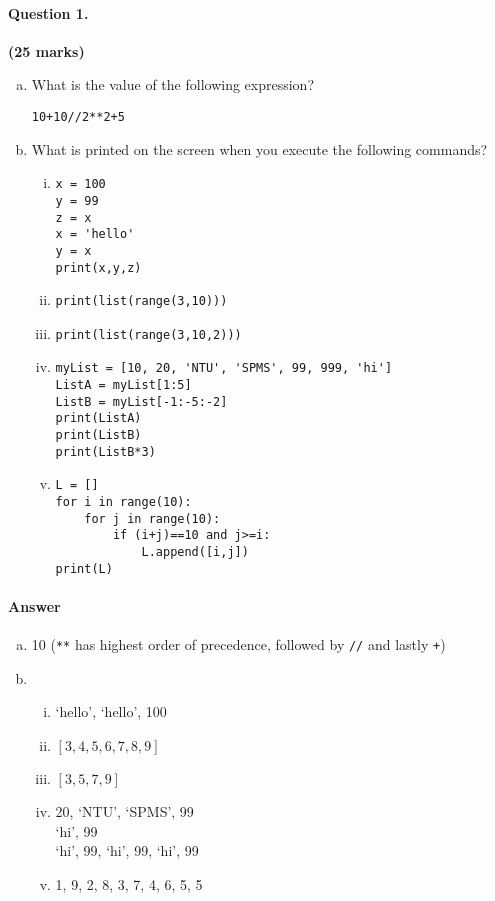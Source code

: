 \documentclass[12pt]{article}
\begin{document}
\paragraph{Question 1.}\hfill {\bf (25 marks)}
\begin{enumerate}[(a)]
\item What is the value of the following expression?
\begin{verbatim}
10+10//2**2+5
\end{verbatim}
\item What is printed on the screen when you execute the following commands?
\begin{enumerate}[(i)]
\item \begin{verbatim}
x = 100
y = 99
z = x
x = 'hello'
y = x
print(x,y,z)
\end{verbatim}
\item \begin{verbatim}
print(list(range(3,10)))\end{verbatim}
\item \begin{verbatim}print(list(range(3,10,2)))\end{verbatim}
\item \begin{verbatim}myList = [10, 20, 'NTU', 'SPMS', 99, 999, 'hi']
ListA = myList[1:5]
ListB = myList[-1:-5:-2]
print(ListA)
print(ListB)
print(ListB*3)
\end{verbatim}
\item \begin{verbatim}
L = []
for i in range(10):
    for j in range(10):
        if (i+j)==10 and j>=i:
            L.append([i,j])
print(L)
\end{verbatim}
\end{enumerate}
\end{enumerate}
\paragraph{Answer}
\begin{enumerate}[(a)]
\item 10 (\verb|**| has highest order of precedence, followed by \verb|//| and lastly \verb|+|)
\item \begin{enumerate}[(i)]

\item `hello', `hello', 100
\item $[3,4,5,6,7,8,9]$
\item $[3,5,7,9]$
\item \text{[}20, `NTU', `SPMS', 99\text{]}\\\text{[}`hi', 99\text{]}\\\text{[}`hi', 99, `hi', 99, `hi', 99\text{]}
\item \text{[}\text{[}1, 9\text{]}, \text{[}2, 8\text{]}, \text{[}3, 7\text{]}, \text{[}4, 6\text{]}, \text{[}5, 5\text{]}\text{]}
\end{enumerate}
\end{enumerate}
\end{document}

